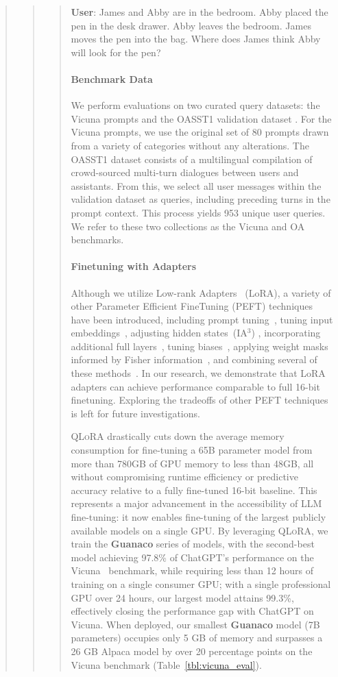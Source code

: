 \begin{quote}
\begin{quote}
\begin{quote}
    \textbf{User}: James and Abby are in the bedroom. Abby placed the pen in the desk drawer. Abby leaves the bedroom. James moves the pen into the bag. Where does James think Abby will look for the pen?

\paragraph{Benchmark Data} We perform evaluations on two curated query datasets: the Vicuna prompts \citep{vicuna2023} and the OASST1 validation dataset \citep{kopf2023openassistant}. For the Vicuna prompts, we use the original set of 80 prompts drawn from a variety of categories without any alterations. The OASST1 dataset consists of a multilingual compilation of crowd-sourced multi-turn dialogues between users and assistants. From this, we select all user messages within the validation dataset as queries, including preceding turns in the prompt context. This process yields 953 unique user queries. We refer to these two collections as the Vicuna and OA benchmarks.

\paragraph{Finetuning with Adapters} Although we utilize Low-rank Adapters~\citep{hu2021lora} (LoRA), a variety of other Parameter Efficient FineTuning (PEFT) techniques have been introduced, including prompt tuning~\citep{qin2021learning,lester2021power,li2021prefix}, tuning input embeddings~\citep{an2022input}, adjusting hidden states~(IA$^3$) \citep{liu2022few}, incorporating additional full layers~\citep{houlsby2019parameter}, tuning biases~\citep{zaken2021bitfit}, applying weight masks informed by Fisher information~\citep{sung2021training}, and combining several of these methods~\citep{henderson2021compacter}. In our research, we demonstrate that LoRA adapters can achieve performance comparable to full 16-bit finetuning. Exploring the tradeoffs of other PEFT techniques is left for future investigations.

\textsc{QLoRA} drastically cuts down the average memory consumption for fine-tuning a 65B parameter model from more than 780GB of GPU memory to less than 48GB, all without compromising runtime efficiency or predictive accuracy relative to a fully fine-tuned 16-bit baseline. This represents a major advancement in the accessibility of LLM fine-tuning: it now enables fine-tuning of the largest publicly available models on a single GPU. By leveraging \textsc{QLoRA}, we train the \textbf{Guanaco} series of models, with the second-best model achieving 97.8\% of ChatGPT’s performance on the Vicuna~\citep{vicuna2023} benchmark, while requiring less than 12 hours of training on a single consumer GPU; with a single professional GPU over 24 hours, our largest model attains 99.3\%, effectively closing the performance gap with ChatGPT on Vicuna. When deployed, our smallest \textbf{Guanaco} model (7B parameters) occupies only 5 GB of memory and surpasses a 26 GB Alpaca model by over 20 percentage points on the Vicuna benchmark (Table~\ref{tbl:vicuna_eval}).


\end{quote}
\end{quote}
\end{quote}
